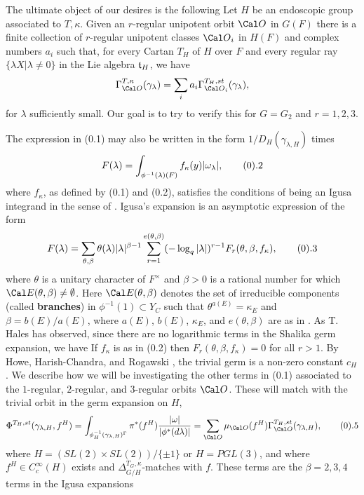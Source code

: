 The ultimate object of our desires is the following
Let $H$ be an endoscopic group 
associated to $T,\kappa$. Given an $r$-regular
unipotent orbit ${\Cal O}$ in $G(F)$ there is a finite collection 
of $r$-regular unipotent classes ${\Cal O}_i$ in $H(F)$ and complex
numbers $a_i$ such that, for every Cartan $T_H$ of $H$ over $F$ and every
regular ray $\{\lambda X|\lambda\not=0\}$ in the Lie algebra ${\frak t}_H$,
we have
$$
\Gamma_{{\Cal O}}^{T,\kappa}(\gamma_\lambda)=
\sum_i a_i\Gamma_{{\Cal O}_i}^{T_H,st}(\gamma_\lambda ),
$$
for $\lambda$ sufficiently small.
\endproclaim
Our goal is to try to verify this for $G=G_2$ and $r=1,2,3$.
\par
The expression in (0.1) may also be written in
the form $1/D_H(\gamma_{\lambda,H})$
times
$$
F(\lambda)=\int_{\phi^{-1}(\lambda)(F)}f_\kappa(y)|\omega_\lambda|,
\tag 0.2
$$
where $f_\kappa$, as defined by (0.1) and (0.2),
satisfies the conditions of being an Igusa integrand
in the sense of \cite{L}. Igusa's expansion
\cite{L} is an asymptotic expression of the form
$$
F(\lambda) =\sum_{\theta,\beta}\theta(\lambda)|\lambda|^{\beta -1}
\sum_{r=1}^{e(\theta,\beta)}(-\log_q|\lambda|)^{r-1}F_r(\theta,\beta,f_\kappa),
\tag 0.3
$$
where $\theta$ is a unitary character of $F^{\times}$ and $\beta >0$
is a rational number for which ${\Cal E}(\theta,\beta)\not= \emptyset$.
Here ${\Cal E}(\theta,\beta)$ denotes the set of irreducible components
(called {\bf branches}) in $\phi^{-1}(1)\subset Y_C$ such that
$\theta^{a(E)}=\kappa_E$ and $\beta=b(E)/a(E)$, where $a(E)$, $b(E)$, 
$\kappa_E$, and $e(\theta,\beta)$ are as in \cite{L}. As T. Hales
has observed, since there are no logarithmic terms in the
Shalika germ expansion, we have 
 If $f_\kappa$ is as in (0.2) then
$F_r(\theta,\beta,f_\kappa)=0$
for all $r>1$. 
\endproclaim
By Howe, Harish-Chandra, and
Rogawski \cite{Ro}, the trivial germ is a non-zero constant $c_H$.
We describe how we will be investigating the other
terms in (0.1) associated to the 
$1$-regular, $2$-regular,
and $3$-regular orbits ${\Cal O}$.
These will match with the trivial orbit in the germ expansion on $H$,
$$
\Phi^{T_H,st}(\gamma_{\lambda,H},f^H)
=\int_{\phi_H^{-1}(\gamma_{\lambda,H})^\Gamma}\pi^*(f^H)
{|\omega|\over |\phi^*(d\lambda)|}
=\sum_{{\Cal O}}\mu_{\Cal O}(f^H)
\Gamma_{{\Cal O}}^{T_H,st}(\gamma_{\lambda,H}),
\tag 0.5
$$
where $H=(SL(2)\times SL(2))/\{\pm 1\}$ or $H=PGL(3)$, and where
$f^H\in C_c^\infty(H)$ exists and
$\Delta^{T_G,\kappa}_{G/H}$-matches with $f$.
These terms are the $\beta =2,3,4$ terms in the Igusa expansions
